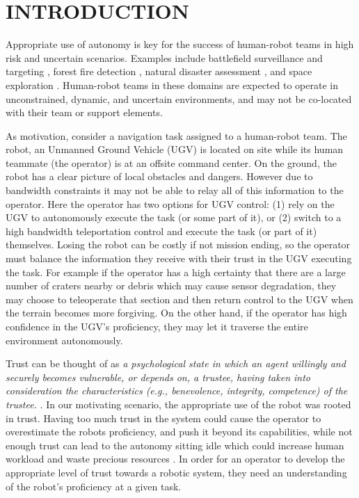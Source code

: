 \documentclass[aaai]{article}
\begin{document}
%
\section{INTRODUCTION} \label{INTRO}
Appropriate use of autonomy is key for the success of human-robot teams in high risk and uncertain scenarios. Examples include battlefield surveillance and targeting \cite{naval_urban_uav,history_of_uavs}, forest fire detection \cite{uav_fire_detection,uav_fire_detection_monitoring,dist_wildfire}, natural disaster assessment \cite{disaster_imaging,disaster_management}, and space exploration \cite{lunar_mining,exploration_robots_space}. Human-robot teams in these domains are expected to operate in unconstrained, dynamic, and uncertain environments, and may not be co-located with their team or support elements.

As motivation, consider a navigation task assigned to a human-robot team. The robot, an Unmanned Ground Vehicle (UGV) is located on site while its human teammate (the operator) is at an offsite command center. On the ground, the robot has a clear picture of local obstacles and dangers. However due to bandwidth constraints it may not be able to relay all of this information to the operator. Here the operator has two options for UGV control: (1) rely on the UGV to autonomously execute the task (or some part of it), or (2) switch to a high bandwidth teleportation control and execute the task (or part of it) themselves. Losing the robot can be costly if not mission ending, so the operator must balance the information they receive with their trust in the UGV executing the task. For example if the operator has a high certainty that there are a large number of craters nearby or debris which may cause sensor degradation, they may choose to teleoperate that section and then return control to the UGV when the terrain becomes more forgiving. On the other hand, if the operator has high confidence in the UGV's proficiency, they may let it traverse the entire environment autonomously.

Trust can be thought of as \emph{a psychological state in which an agent willingly and securely becomes vulnerable, or depends on, a trustee, having taken into consideration the characteristics (e.g., benevolence, integrity, competence) of the trustee.} \cite{israelsen2019dave}. In our motivating scenario, the appropriate use of the robot was rooted in trust. Having too much trust in the system could cause the operator to overestimate the robots proficiency, and push it beyond its capabilities, while not enough trust can lead to the autonomy sitting idle which could increase human workload and waste precious resources \cite{misuse_disuse}. In order for an operator to develop the appropriate level of trust towards a robotic system, they need an understanding of the robot's proficiency at a given task.
\end{document}
